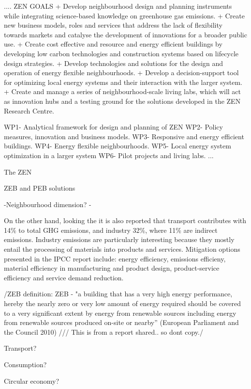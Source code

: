 .... ZEN GOALS
+ Develop neighbourhood design and planning instruments while integrating science-based knowledge on greenhouse gas emissions.
+ Create new business models, roles and services that address the lack of flexibility towards markets and catalyse the  development of innovations for a broader public use.
+ Create cost effective and resource and energy efficient buildings by developing low carbon technologies and construction systems based on lifecycle design strategies.
+ Develop technologies and solutions for the design and operation of energy flexible neighbourhoods.
+ Develop a decision-support tool for optimizing local energy systems and their interaction with the larger system.
+ Create and manage a series of neighbourhood-scale living labs, which will act as innovation hubs and a testing ground for the solutions developed in the ZEN Research Centre.

WP1- Analytical framework for design and planning of ZEN
WP2- Policy measures, innovation and business models. 
WP3- Responsive and energy efficient buildings. 
WP4- Energy flexible neighbourhoods. 
WP5- Local energy system optimization in a larger system
WP6- Pilot projects and living labs.
...





The ZEN








ZEB and PEB solutions 

 

-Neighbourhood dimension?
-



On the other hand, looking the it is also reported that transport contributes with 14\% to total GHG emissions, and industry 32\%, where 11\% are indirect emissions. Industry emissions are particularly interesting because they mostly entail the processing of materials into products and services. Mitigation options presented in the IPCC report include: energy efficiency, emissions efficieny, material efficiency in manufacturing and product design, product-service efficiency and service demand reduction. 




/ZEB definition: ZEB - "a building that has a very high energy performance, hereby the nearly zero or very low amount of energy required should be covered to a very significant extent by energy from renewable sources including energy from renewable sources produced on-site or nearby” (European Parliament and the Council 2010) /// This is from a report shared.. so dont copy./




Transport?


Consumption?


Circular economy?


